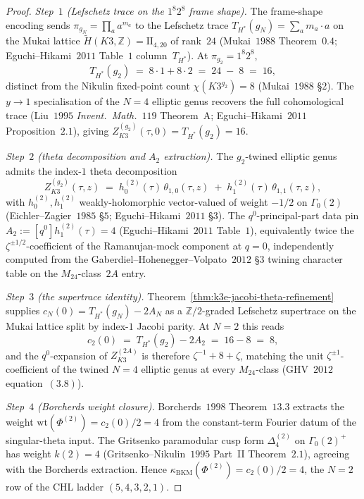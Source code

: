 \begin{proof}
\emph{Step~$1$ (Lefschetz trace on the $1^8 2^8$ frame shape).}
The frame-shape encoding sends $\pi_{g_N} = \prod_a a^{m_a}$ to the
Lefschetz trace $T_{H^*}(g_N) = \sum_a m_a \cdot a$ on the Mukai
lattice $\widetilde{H}(K3, \mathbb{Z}) = \mathrm{II}_{4, 20}$ of
rank~$24$ (Mukai~$1988$ Theorem~$0.4$; Eguchi--Hikami~$2011$
Table~$1$ column~$T_{H^*}$). At $\pi_{g_2} = 1^8 2^8$,
\[
 T_{H^*}(g_2) \;=\; 8 \cdot 1 + 8 \cdot 2 \;=\; 24 \;-\; 8 \;=\; 16,
\]
distinct from the Nikulin fixed-point count $\chi(K3^{g_2}) = 8$
(Mukai~$1988$ \S$2$). The $y \to 1$ specialisation of the
$N{=}4$ elliptic genus recovers the full cohomological trace
(Liu~$1995$ \emph{Invent.~Math.}~$119$ Theorem~A;
Eguchi--Hikami~$2011$ Proposition~$2.1$), giving
$Z^{(g_2)}_{K3}(\tau, 0) = T_{H^*}(g_2) = 16$.

\emph{Step~$2$ (theta decomposition and $A_2$ extraction).}
The $g_2$-twined elliptic genus admits the index-$1$ theta
decomposition
\[
 Z^{(g_2)}_{K3}(\tau, z)
 \;=\; h^{(2)}_0(\tau)\, \theta_{1, 0}(\tau, z)
 \;+\; h^{(2)}_1(\tau)\, \theta_{1, 1}(\tau, z),
\]
with $h^{(2)}_0, h^{(2)}_1$ weakly-holomorphic vector-valued of
weight $-1/2$ on $\Gamma_0(2)$ (Eichler--Zagier~$1985$ \S$5$;
Eguchi--Hikami~$2011$ \S$3$). The $q^0$-principal-part data pin
$A_2 := [q^0] h^{(2)}_1(\tau) = 4$ (Eguchi--Hikami~$2011$
Table~$1$), equivalently twice the $\zeta^{\pm 1/2}$-coefficient of
the Ramanujan-mock component at $q = 0$, independently computed
from the Gaberdiel--Hohenegger--Volpato~$2012$ \S$3$ twining
character table on the $M_{24}$-class~$2A$ entry.

\emph{Step~$3$ (the supertrace identity).}
Theorem~\ref{thm:k3e-jacobi-theta-refinement} supplies
$c_N(0) = T_{H^*}(g_N) - 2 A_N$ as a $\mathbb{Z}/2$-graded Lefschetz
supertrace on the Mukai lattice split by index-$1$ Jacobi parity.
At $N = 2$ this reads
\[
 c_2(0) \;=\; T_{H^*}(g_2) - 2 A_2 \;=\; 16 - 8 \;=\; 8,
\]
and the $q^0$-expansion of $Z^{(2A)}_{K3}$ is therefore
$\zeta^{-1} + 8 + \zeta$, matching the unit $\zeta^{\pm 1}$-coefficient
of the twined $N{=}4$ elliptic genus at every $M_{24}$-class
(GHV~$2012$ equation~$(3.8)$).

\emph{Step~$4$ (Borcherds weight closure).}
Borcherds~$1998$ Theorem~$13.3$ extracts the weight
$\mathrm{wt}(\Phi^{(2)}) = c_2(0)/2 = 4$ from the constant-term
Fourier datum of the singular-theta input. The Gritsenko paramodular
cusp form $\Delta_4^{(2)}$ on $\Gamma_0(2)^+$ has weight
$k(2) = 4$ (Gritsenko--Nikulin~$1995$ Part~II Theorem~$2.1$),
agreeing with the Borcherds extraction. Hence
$\kappa_{\mathrm{BKM}}(\Phi^{(2)}) = c_2(0)/2 = 4$,
the $N = 2$ row of the CHL ladder $(5, 4, 3, 2, 1)$.
\end{proof}

